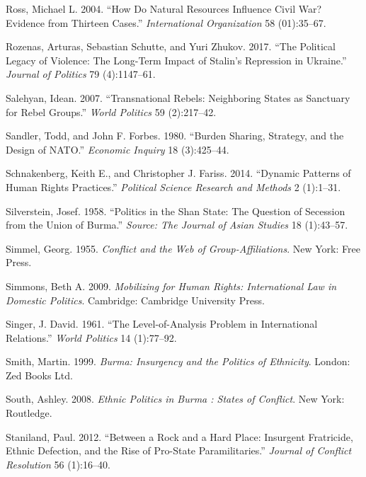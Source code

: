 \documentclass[12pt,]{book}
\theoremstyle{definition}
\theoremstyle{definition}
\theoremstyle{definition}
\theoremstyle{remark}
\begin{document}
\leavevmode\hypertarget{ref-Ross2004e}{}%
Ross, Michael L. 2004. ``How Do Natural Resources Influence Civil War?
Evidence from Thirteen Cases.'' \emph{International Organization} 58
(01):35--67.

\leavevmode\hypertarget{ref-Rozenas2017}{}%
Rozenas, Arturas, Sebastian Schutte, and Yuri Zhukov. 2017. ``The
Political Legacy of Violence: The Long-Term Impact of Stalin's
Repression in Ukraine.'' \emph{Journal of Politics} 79 (4):1147--61.

\leavevmode\hypertarget{ref-salehyan07}{}%
Salehyan, Idean. 2007. ``Transnational Rebels: Neighboring States as
Sanctuary for Rebel Groups.'' \emph{World Politics} 59 (2):217--42.

\leavevmode\hypertarget{ref-Sandler1980}{}%
Sandler, Todd, and John F. Forbes. 1980. ``Burden Sharing, Strategy, and
the Design of NATO.'' \emph{Economic Inquiry} 18 (3):425--44.

\leavevmode\hypertarget{ref-Schnakenberg2014}{}%
Schnakenberg, Keith E., and Christopher J. Fariss. 2014. ``Dynamic
Patterns of Human Rights Practices.'' \emph{Political Science Research
and Methods} 2 (1):1--31.

\leavevmode\hypertarget{ref-Silverstein1958}{}%
Silverstein, Josef. 1958. ``Politics in the Shan State: The Question of
Secession from the Union of Burma.'' \emph{Source: The Journal of Asian
Studies} 18 (1):43--57.

\leavevmode\hypertarget{ref-Simmel1955}{}%
Simmel, Georg. 1955. \emph{Conflict and the Web of Group-Affiliations}.
New York: Free Press.

\leavevmode\hypertarget{ref-simmons09}{}%
Simmons, Beth A. 2009. \emph{Mobilizing for Human Rights: International
Law in Domestic Politics}. Cambridge: Cambridge University Press.

\leavevmode\hypertarget{ref-Singer1961}{}%
Singer, J. David. 1961. ``The Level-of-Analysis Problem in International
Relations.'' \emph{World Politics} 14 (1):77--92.

\leavevmode\hypertarget{ref-Smith1999}{}%
Smith, Martin. 1999. \emph{Burma: Insurgency and the Politics of
Ethnicity}. London: Zed Books Ltd.

\leavevmode\hypertarget{ref-South2008}{}%
South, Ashley. 2008. \emph{Ethnic Politics in Burma : States of
Conflict}. New York: Routledge.

\leavevmode\hypertarget{ref-Staniland2012d}{}%
Staniland, Paul. 2012. ``Between a Rock and a Hard Place: Insurgent
Fratricide, Ethnic Defection, and the Rise of Pro-State
Paramilitaries.'' \emph{Journal of Conflict Resolution} 56 (1):16--40.
\end{document}
